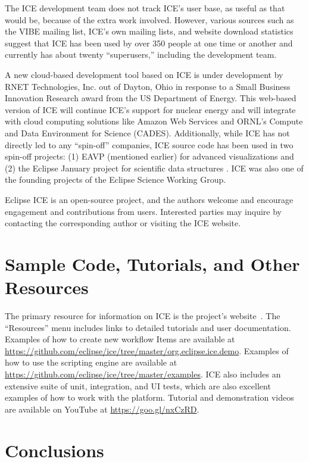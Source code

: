 The ICE development team does not track ICE's user base, as useful as
that would be, because of the extra work involved. However, various
sources such as the VIBE mailing list, ICE's own mailing lists, and
website download statistics suggest that ICE has been used by over 350
people at one time or another and currently has about twenty
``superusers,'' including the development team.

A new cloud-based development tool based on ICE is under development by
RNET Technologies, Inc. out of Dayton, Ohio in response to a Small Business Innovation 
Research award from the US Department of Energy. This web-based version of 
ICE will continue ICE's support for nuclear energy and will integrate with cloud 
computing solutions like Amazon Web Services and ORNL's Compute and Data
Environment for Science (CADES). Additionally, while ICE has not directly led to
any ``spin-off'' companies, ICE source code has been used
in two spin-off projects: (1) EAVP (mentioned earlier) for advanced
visualizations and (2) the Eclipse January project for scientific data
structures \cite{graham_eclipse_2016}. ICE was also one of the founding
projects of the Eclipse Science Working Group.

Eclipse ICE is an open-source project, and the authors welcome and encourage
engagement and contributions from users. Interested parties may inquire by
contacting the corresponding author or visiting the ICE website.

\section{Sample Code, Tutorials, and Other
Resources}\label{sample-code-tutorials-and-other-resources}

The primary resource for information on ICE is the project's 
website~\cite{billings_eclipse_2016}. The ``Resources'' menu includes links to
detailed tutorials and user documentation. Examples of how to create
new workflow Items are available at
\url{https://github.com/eclipse/ice/tree/master/org.eclipse.ice.demo}.
Examples of how to use the scripting engine are available at
\url{https://github.com/eclipse/ice/tree/master/examples}. ICE also includes an
extensive suite of unit, integration, and UI tests, which are
also excellent examples of how to work with the platform. Tutorial and demonstration videos are available on YouTube at \url{https://goo.gl/nxCzRD}.

\section{Conclusions}\label{conclusions}

